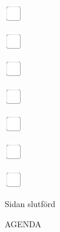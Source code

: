 \documentclass[11pt,titlepage]{article}
\begin{document}
\vspace{10mm}

\noindent
\includegraphics[]{checkbox-4mm.pdf}

\vspace{10mm}

\noindent
\includegraphics[]{checkbox-4mm.pdf}

\vspace{10mm}

\noindent
\includegraphics[]{checkbox-4mm.pdf}

\vspace{10mm}

\noindent
\includegraphics[]{checkbox-4mm.pdf}

\vspace{10mm}

\noindent
\includegraphics[]{checkbox-4mm.pdf}

\vspace{10mm}

\noindent
\includegraphics[]{checkbox-4mm.pdf}

\vspace{10mm}

\noindent
\includegraphics[]{checkbox-4mm.pdf}

\vspace{4mm}

\hfill Sidan slutförd \hspace{20mm}

\pagebreak

\small %
\hfill AGENDA
\end{document}
